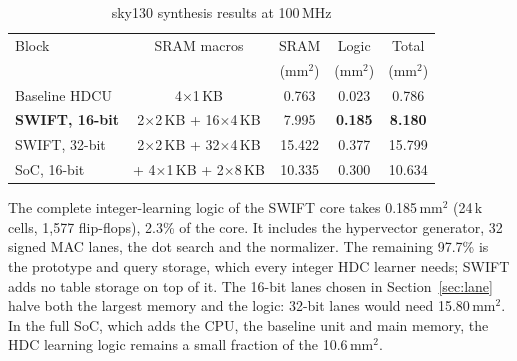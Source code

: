 \documentclass[conference]{IEEEtran}
\begin{document}
\begin{table}[t]
\caption{sky130 synthesis results at 100\,MHz}
\label{tab:area}
\centering\scriptsize
\setlength{\tabcolsep}{3pt}
\begin{tabular}{@{}lcccc@{}}
\toprule
Block & SRAM macros & SRAM & Logic & Total \\
 & & (mm$^2$) & (mm$^2$) & (mm$^2$) \\
\midrule
Baseline HDCU & 4$\times$1\,KB & 0.763 & 0.023 & 0.786 \\
\textbf{SWIFT, 16-bit} & 2$\times$2\,KB + 16$\times$4\,KB & 7.995 & \textbf{0.185} & \textbf{8.180} \\
SWIFT, 32-bit & 2$\times$2\,KB + 32$\times$4\,KB & 15.422 & 0.377 & 15.799 \\
SoC, 16-bit & + 4$\times$1\,KB + 2$\times$8\,KB & 10.335 & 0.300 & 10.634 \\
\bottomrule
\end{tabular}
\end{table}

The complete integer-learning logic of the SWIFT core takes 0.185\,mm$^2$ (24\,k cells, 1,577 flip-flops), 2.3\% of the core. It includes the hypervector generator, 32 signed MAC lanes, the dot search and the normalizer. The remaining 97.7\% is the prototype and query storage, which every integer HDC learner needs; SWIFT adds no table storage on top of it. The 16-bit lanes chosen in Section~\ref{sec:lane} halve both the largest memory and the logic: 32-bit lanes would need 15.80\,mm$^2$. In the full SoC, which adds the CPU, the baseline unit and main memory, the HDC learning logic remains a small fraction of the 10.6\,mm$^2$.
\end{document}
